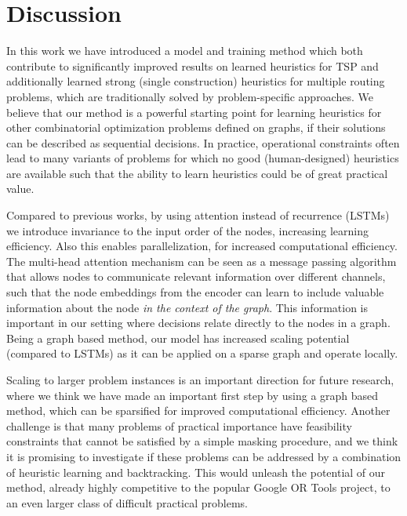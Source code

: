 \section{Discussion}
\label{sec:discussion}
In this work we have introduced a model and training method which both contribute to significantly improved results on learned heuristics for TSP and additionally learned strong (single construction) heuristics for multiple routing problems, which are traditionally solved by problem-specific approaches. We believe that our method is a powerful starting point for learning heuristics for other combinatorial optimization problems defined on graphs, if their solutions can be described as sequential decisions. In practice, operational constraints often lead to many variants of problems for which no good (human-designed) heuristics are available such that the ability to learn heuristics could be of great practical value.

Compared to previous works, by using attention instead of recurrence (LSTMs) we introduce invariance to the input order of the nodes, increasing learning efficiency. Also this enables parallelization, for increased computational efficiency. The multi-head attention mechanism can be seen as a message passing algorithm that allows nodes to communicate relevant information over different channels, such that the node embeddings from the encoder can learn to include valuable information about the node \emph{in the context of the graph}. This information is important in our setting where decisions relate directly to the nodes in a graph. Being a graph based method, our model has increased scaling potential (compared to LSTMs) as it can be applied on a sparse graph and operate locally.

Scaling to larger problem instances is an important direction for future research, where we think we have made an important first step by using a graph based method, which can be sparsified for improved computational efficiency. Another challenge is that many problems of practical importance have feasibility constraints that cannot be satisfied by a simple masking procedure, and we think it is promising to investigate if these problems can be addressed by a combination of heuristic learning and backtracking. This would unleash the potential of our method, already highly competitive to the popular Google OR Tools project, to an even larger class of difficult practical problems.
